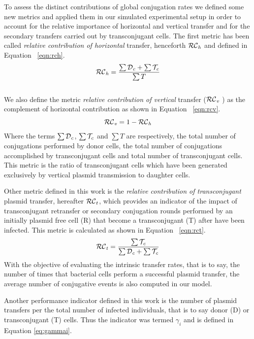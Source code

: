 To assess the distinct contributions of global conjugation rates we defined some new metrics and applied them in our simulated experimental setup in order to account for the relative importance of horizontal and vertical transfer and for the secondary transfers carried out by transconjugant cells. The first metric has been called {\it relative contribution of horizontal} transfer, henceforth $\mathcal{RC}_{\it h}$ and defined in Equation ~\ref{eqn:rch}.
\\
\begin{equation}
\mathcal{RC}_{\it h} = \frac{\sum \mathcal{D}_{\it c} + \sum \mathcal{T}_{\it c}}{\sum T} 
\label{eqn:rch}
\end{equation}
\\
We also define the metric {\it relative contribution of vertical} transfer ($\mathcal{RC}_{\it v}$ ) as the complement of horizontal contribution as shown in Equation ~\ref{eqn:rcv}.
\\
\begin{equation}
\mathcal{RC}_{\it v} = 1 - \mathcal{RC}_{\it h}
\label{eqn:rcv}
\end{equation}
Where the terms $\sum \mathcal{D}_{\it c}$, $\sum \mathcal{T}_{\it c}$ and $\sum T$ are respectively, the total number of conjugations performed by donor cells, the total number of conjugations accomplished by transconjugant cells and total number of transconjugant cells. This metric is the ratio of transconjugant cells which have been generated exclusively by vertical plasmid transmission to daughter cells.

Other metric defined in this work is the {\it relative contribution of transconjugant} plasmid transfer, hereafter $\mathcal{RC}_{\it t}$, which provides an indicator of the impact of transconjugant retransfer or secondary conjugation rounds performed by an initially plasmid free cell (R) that become a transconjugant (T) after have been infected. This metric is calculated as shown in Equation ~\ref{eqn:rct}.
\\
\begin{equation}
\mathcal{RC}_{\it t} = \frac{\sum \mathcal{T}_{\it c}}{\sum \mathcal{D}_{\it c} + \sum \mathcal{T}_{\it c}} 
\label{eqn:rct}
\end{equation}
With the objective of evaluating the intrinsic transfer rates, that is to say, the number of times that bacterial cells perform a successful plasmid transfer, the average number of conjugative events is also computed in our model. 

Another performance indicator defined in this work is the number of plasmid transfers per the total number of infected individuals, that is to say donor (D) or transconjugant (T) cells. Thus the indicator was termed $\gamma_i$ and is defined in Equation \eqref{eq:gammai}.

